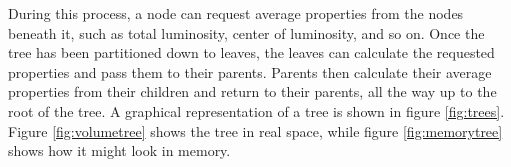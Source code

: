 During this process, a node can request average properties from the nodes beneath it, such as total luminosity, center of luminosity, and so on. Once the tree has been partitioned down to leaves, the leaves can calculate the requested properties and pass them to their parents. Parents then calculate their average properties from their children and return to their parents, all the way up to the root of the tree. A graphical representation of a tree is shown in figure \ref{fig:trees}. Figure \ref{fig:volumetree} shows the tree in real space, while figure \ref{fig:memorytree} shows how it might look in memory.



